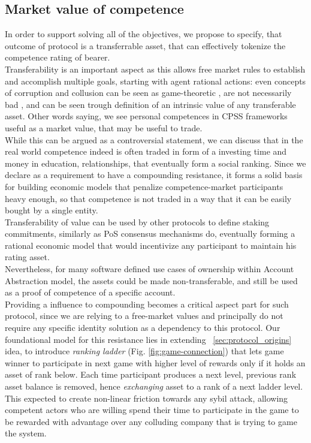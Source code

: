 \documentclass{article}
\begin{document}
\begin{CJK}{UTF8}{gbsn}
\begin{multicols}{2}
        \subsection{Market value of competence}
        \label{sec:market-values}
        In order to support solving all of the objectives, we propose to specify, that outcome of protocol is a transferrable asset, that can effectively tokenize the competence rating of bearer. \\
        Transferability is an important aspect as this allows free market rules to establish and accomplish multiple goals, starting with agent rational actions: even concepts of corruption and collusion can be seen as game-theoretic \cite{Macrae1982}, are not necessarily bad \cite{Leff1964}, and can be seen trough definition of an intrinsic value of any transferable asset. Other words saying, we see personal competences in CPSS frameworks useful as a market value, that may be useful to trade. \\While this can be argued as a controversial statement, we can discuss that in the real world competence indeed is often traded in form of a investing time and money in education, relationships, that eventually form a social ranking. Since we declare as a requirement to have a compounding resistance, it forms a solid basis for building economic models that penalize competence-market participants heavy enough,  so that competence is not traded in a way that it can be easily bought by a single entity.\\ Transferability of value can be used by other protocols to define staking commitments, similarly as PoS consensus mechanisms do, eventually forming a rational economic model that would incentivize any participant to maintain his rating asset.\\
        Nevertheless, for many software defined use cases of ownership within Account Abstraction\cite{Qin2023} model, the assets could be made non-transferable, and still be used as a proof of competence of a specific account.\\
        Providing a influence to compounding becomes a critical aspect part for such protocol, since we are relying to a free-market values and principally do not require any specific identity solution as a dependency to this protocol.
        Our foundational model for this resistance lies in extending  ~\ref{sec:protocol_origins} idea, to introduce \textit{ranking ladder} (Fig. \ref*{fig:game-connection}) that lets game winner to participate in next game with higher level of rewards only if it holds an asset of rank below. Each time participant produces a next level, previous rank asset balance is removed, hence \textit{exchanging} asset to a rank of a next ladder level. This expected to create non-linear friction towards any sybil attack, allowing competent actors who are willing spend their time to participate in the game to be rewarded with advantage over any colluding company that is trying to game the system. 


\end{multicols}
\end{CJK}
\end{document}
